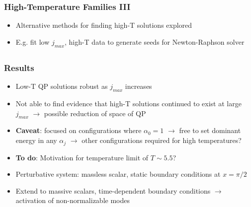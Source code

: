 \documentclass[mathserif,10pt]{beamer}
\newcommand{\bi}{\begin{itemize}}
\newcommand{\ei}{\end{itemize}}
\newcommand{\its}{\item}
\newcommand{\jm}{j_{max}}
\begin{document}
{\frame
{
  \frametitle{High-Temperature Families III}
  \bi
  \its Alternative methods for finding high-T solutions explored 
  \its E.g. fit low $\jm$, high-T data to generate seeds for Newton-Raphson solver
     \ei
   \begin{overlayarea}{\textwidth}{0.65\textheight}
      \begin{figure}
      \centering
      \end{figure}
  \end{overlayarea}
}


\subsection*{}
\frame
{
  \frametitle{Results}
    \bi
    \its Low-T QP solutions robust as $\jm$ increases
    \its Not able to find evidence that high-T solutions continued to exist at large $\jm$ $\to$ possible reduction of space of QP
    \its {\bf Caveat}: focused on configurations where $\alpha_0 = 1$ $\to$ free to set dominant energy in any $\alpha_j$ $\to$ other configurations required for high temperatures?
    \its {\bf To do}: Motivation for temperature limit of $T \sim 5.5$?
    \its Perturbative system: massless scalar, static boundary conditions at $x = \pi/2$
    \its Extend to massive scalars, time-dependent boundary conditions $\to$ activation of non-normalizable modes
    \ei
}

}
\end{document}
